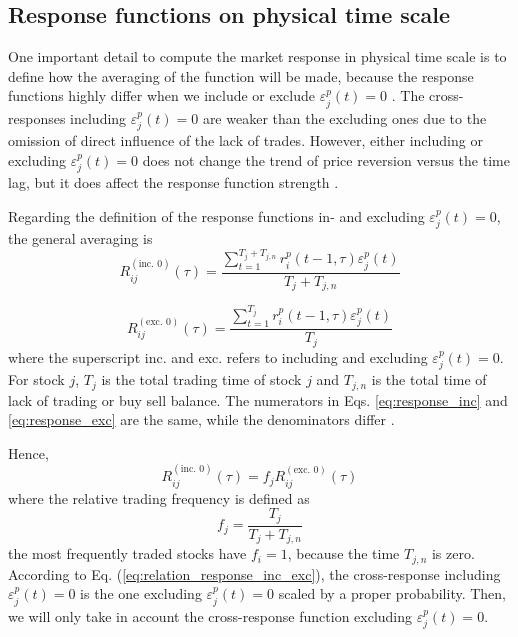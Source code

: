 \subsection{Response functions on physical time scale}
\label{subsec:response_function_physical}

One important detail to compute the market response in physical time scale is
to define how the averaging of the function will be made, because the
response functions highly differ when we include or exclude
$\varepsilon^{p}_j \left( t\right) = 0$ \cite{Wang_2016_cross}. The
cross-responses including $\varepsilon^{p}_j \left( t\right) = 0$ are weaker
than the excluding ones due to the omission of direct influence of the lack of
trades. However, either including or excluding
$\varepsilon^{p}_j \left( t\right) = 0$ does not change the trend of price
reversion versus the time lag, but it does affect the response function
strength \cite{Wang_2016_avg}.

Regarding the definition of the response functions in- and excluding
$\varepsilon^{p}_j \left( t\right) = 0$, the general averaging is
\begin{equation}\label{eq:response_inc}
    R_{ij}^{\left(\text{inc. }0\right)}\left(\tau\right)=
    \frac{\sum_{t=1}^{T_{j}+T_{j,n}} r^{p}_{i}\left(t - 1,\tau\right)
    \varepsilon_{j}^{p}\left(t \right)}{T_{j}+T_{j,n}}
\end{equation}

\begin{equation}\label{eq:response_exc}
    R_{ij}^{\left(\text{exc. }0\right)}\left(\tau\right)=
    \frac{\sum_{t=1}^{T_{j}} r^{p}_{i}\left(t - 1,\tau\right)
    \varepsilon_{j}^{p} \left(t\right)}{T_{j}}
\end{equation}
where the superscript inc. and exc. refers to including and excluding
$\varepsilon^{p}_j \left( t\right) = 0$. For stock $j$, $T_j$  is the total
trading time of stock $j$ and $T_{j,n}$ is the total time of lack of trading or
buy sell balance. The numerators in Eqs. \ref{eq:response_inc} and
\ref{eq:response_exc} are the same, while the denominators differ
\cite{Wang_2016_avg}.

Hence,
\begin{equation}\label{eq:relation_response_inc_exc}
    R_{ij}^{\left(\text{inc. }0\right)}\left(\tau\right)=f_{j}
    R_{ij}^{\left(\text{exc. }0\right)}\left(\tau\right)
\end{equation}
where the relative trading frequency is defined as \cite{Wang_2016_avg}
\begin{equation}\label{eq:response_trading_frequency}
    f_{j}=\frac{T_{j}}{T_{j}+T_{j,n}}
\end{equation}
the most frequently traded stocks have $f_{i} = 1$, because the time $T_{j,n}$
is zero. According to Eq. (\ref{eq:relation_response_inc_exc}), the
cross-response including $\varepsilon^{p}_j \left( t\right) = 0$ is the one
excluding $\varepsilon^{p}_j \left( t\right) = 0$ scaled by a proper
probability. Then, we will only take in account the cross-response function
excluding $\varepsilon^{p}_j \left( t\right) = 0$.


